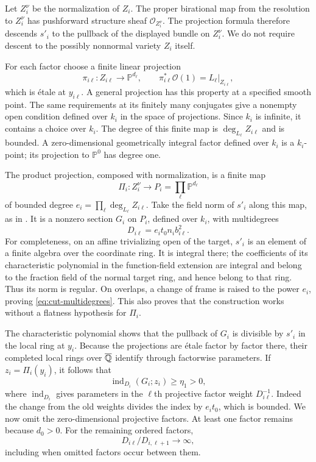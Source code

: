 Let $Z_i^\nu$ be the normalization of $Z_i$.  The proper
birational map from the resolution to $Z_i^\nu$ has
pushforward structure sheaf $\mathcal O_{Z_i^\nu}$.  The
projection formula therefore descends $s'_i$ to the pullback of the
displayed bundle on $Z_i^\nu$.  We do not require descent to
the possibly nonnormal variety $Z_i$ itself.

For each factor choose a finite linear projection
\[
 \pi_{i\ell}:Z_{i\ell}\longrightarrow\mathbb P^{d_\ell},
 \qquad \pi_{i\ell}^*\mathcal O(1)=L_\ell|_{Z_{i\ell}},
\]
which is \'{e}tale at $y_{i\ell}$.  A general projection has this
property at a specified smooth point.  The same requirements at its
finitely many conjugates give a nonempty open condition defined over
$k_i$ in the space of projections.  Since $k_i$ is infinite, it
contains a choice over $k_i$.  The degree of this finite map is
$\deg_{L_\ell}Z_{i\ell}$ and is bounded.  A zero-dimensional
geometrically integral factor defined over $k_i$ is a $k_i$-point;
its projection to $\mathbb P^0$ has degree one.

The product projection, composed with normalization, is a finite map
\[
 \Pi_i:Z_i^\nu\longrightarrow
            P_i=\prod_\ell\mathbb P^{d_\ell}
\]
of bounded degree
$e_i=\prod_\ell\deg_{L_\ell}Z_{i\ell}$.
Take the field norm of $s'_i$ along this map, as in
\cite[p.~565]{Faltings1991}.  It is a nonzero
section $G_i$ on $P_i$, defined over $k_i$, with multidegrees
\begin{equation}\label{eq:cut-multidegrees}
 D_{i\ell}=e_it_0n_ib_{i\ell}^2.
\end{equation}
For completeness, on an affine trivializing open of the target,
$s'_i$ is an element of a finite algebra over the coordinate ring.
It is integral there; the coefficients of its characteristic
polynomial in the function-field extension are integral and belong
to the fraction field of the normal target ring, and hence belong
to that ring.  Thus its norm is regular.  On overlaps, a change of
frame is raised to the power $e_i$, proving
\eqref{eq:cut-multidegrees}.  This also proves that the construction
works without a flatness hypothesis for $\Pi_i$.

The characteristic polynomial shows that the pullback of $G_i$ is
divisible by $s'_i$ in the local ring at $y_i$.  Because the
projections are \'{e}tale factor by factor there, their completed local
rings over $\overline{\mathbb Q}$ identify through factorwise parameters.  If
$z_i=\Pi_i(y_i)$, it follows that
\begin{equation}\label{eq:cut-polynomial-index}
 \operatorname{ind}_{D_i}(G_i;z_i)\ge\eta_1>0,
\end{equation}
where $\operatorname{ind}_{D_i}$ gives parameters in the $\ell$th
projective factor weight $D_{i\ell}^{-1}$.  Indeed the change from
the old weights divides the index by $e_it_0$, which is bounded.
We now omit the zero-dimensional projective factors.  At least one
factor remains because $d_0>0$.  For the remaining ordered factors,
\begin{equation}\label{eq:cut-ratios}
 D_{i\ell}/D_{i,\ell+1}\longrightarrow\infty,
\end{equation}
including when omitted factors occur between them.

